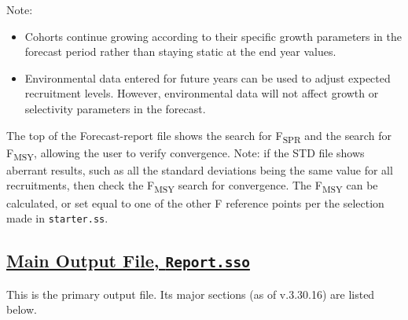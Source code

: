 Note:
\begin{itemize}
	\item Cohorts continue growing according to their specific growth parameters in the forecast period rather than staying static at the end year values.
	\item Environmental data entered for future years can be used to adjust expected recruitment levels. However, environmental data will not affect growth or selectivity parameters in the forecast.
\end{itemize}

The top of the Forecast-report file shows the search for F\textsubscript{SPR}  and the search for F\textsubscript{MSY}, allowing the user to verify convergence. Note: if the STD file shows aberrant results, such as all the standard deviations being the same value for all recruitments, then check the F\textsubscript{MSY} search for convergence. The F\textsubscript{MSY} can be calculated, or set equal to one of the other F reference points per the selection made in \texttt{starter.ss}.

\hypertarget{MainOutput}{}
\subsection[Main Output File, \texttt{Report.sso}]{\protect\hyperlink{MainOutput}{Main Output File, \texttt{Report.sso}}}
This is the primary output file. Its major sections (as of v.3.30.16) are listed below.  

